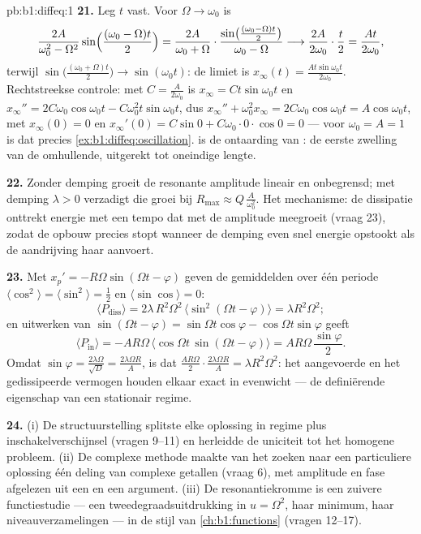 \begin{solution}{pb:b1:diffeq:1}
\textbf{21.} Leg $t$ vast. Voor $\Omega \to \omega_0$ is
\[
\frac{2A}{\omega_0^2 - \Omega^2}\sin\Bigl(\frac{(\omega_0 -
\Omega)t}2\Bigr)
= \frac{2A}{\omega_0 + \Omega}\cdot
\frac{\sin\bigl(\frac{(\omega_0 - \Omega)t}2\bigr)}
{\omega_0 - \Omega}
\longrightarrow \frac{2A}{2\omega_0}\cdot\frac t2
= \frac{At}{2\omega_0} ,
\]
terwijl $\sin\bigl(\frac{(\omega_0 + \Omega)t}2\bigr) \to \sin(\omega_0
t)$: de limiet is $x_\infty(t) = \frac{At\sin\omega_0 t}{2\omega_0}$.
Rechtstreekse controle: met $C = \frac A{2\omega_0}$ is $x_\infty =
Ct\sin\omega_0 t$ en $x_\infty'' = 2C\omega_0\cos\omega_0 t -
C\omega_0^2 t \sin\omega_0 t$, dus $x_\infty'' + \omega_0^2 x_\infty =
2C\omega_0\cos\omega_0 t = A\cos\omega_0 t$, met $x_\infty(0) = 0$ en
$x_\infty'(0) = C\sin 0 + C\omega_0 \cdot 0 \cdot \cos 0 = 0$ --- voor
$\omega_0 = A = 1$ is dat precies
\cref{ex:b1:diffeq:oscillation}.  is de ontaarding van
: de eerste zwelling van de omhullende, uitgerekt tot oneindige
lengte.

\textbf{22.} Zonder demping groeit de resonante amplitude lineair en
onbegrensd; met demping $\lambda > 0$ verzadigt die groei bij $R_{\max}
\approx Q\,\frac A{\omega_0^2}$. Het mechanisme: de dissipatie onttrekt
energie met een tempo dat met de amplitude meegroeit (vraag 23), zodat de
opbouw precies stopt wanneer de demping even snel energie opstookt als de
aandrijving haar aanvoert.

\textbf{23.} Met $x_p' = -R\Omega\sin(\Omega t - \varphi)$ geven de
gemiddelden over één periode $\langle\cos^2\rangle =
\langle\sin^2\rangle = \frac12$ en $\langle\sin\cos\rangle = 0$:
\[
\langle P_{\mathrm{diss}}\rangle
= 2\lambda\,R^2\Omega^2\,\langle\sin^2(\Omega t -
\varphi)\rangle = \lambda R^2\Omega^2 ;
\]
en uitwerken van $\sin(\Omega t - \varphi) = \sin\Omega t\cos\varphi -
\cos\Omega t\sin\varphi$ geeft
\[
\langle P_{\mathrm{in}}\rangle
= -AR\Omega\,\bigl\langle\cos\Omega t\,\sin(\Omega t -
\varphi)\bigr\rangle
= AR\Omega\,\frac{\sin\varphi}2 .
\]
Omdat $\sin\varphi = \frac{2\lambda\Omega}{\sqrt D} =
\frac{2\lambda\Omega R}A$, is dat $\frac{AR\Omega}2 \cdot
\frac{2\lambda\Omega R}A = \lambda R^2\Omega^2$: het aangevoerde en het
gedissipeerde vermogen houden elkaar exact in evenwicht --- de
definiërende eigenschap van een stationair regime.

\textbf{24.} (i) De structuurstelling splitste elke oplossing in regime
plus inschakelverschijnsel (vragen 9--11) en herleidde de uniciteit tot
het homogene probleem. (ii) De complexe methode maakte van het zoeken
naar een particuliere oplossing één deling van complexe getallen (vraag
6), met amplitude en fase afgelezen uit een  en een argument.
(iii) De resonantiekromme is een zuivere functiestudie --- een
tweedegraadsuitdrukking in $u = \Omega^2$, haar minimum, haar
niveauverzamelingen --- in de stijl van \cref{ch:b1:functions} (vragen
12--17).


\end{solution}
